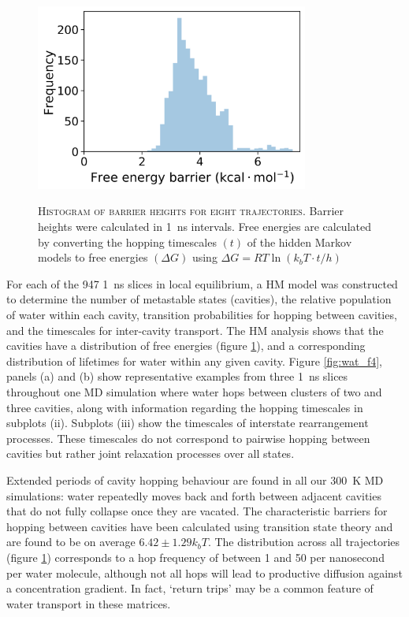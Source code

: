 \begin{figure}
    \centering
    \caption[Histogram of barrier heights for eight trajectories]{\textsc{Histogram of barrier heights for eight trajectories}. Barrier heights were calculated in \SI{1}{\nano\second} intervals. Free energies are calculated by converting the hopping timescales $(t)$ of the hidden Markov models to free energies $(\Delta G)$ using $\Delta G=R T \ln \left(k_{b} T \cdot t / h\right)$}
    \includegraphics[width=0.8\textwidth]{chapters/water_hopping/figures/Fig_S10.png}
    \label{fig:wat_s9}
\end{figure}

For each of the \num{947} \SI{1}{\nano\second} slices in local equilibrium, a HM model was constructed to determine the number of metastable states (cavities), the relative population of water within each cavity, transition probabilities for hopping between cavities, and the timescales for inter-cavity transport. The HM analysis shows that the cavities have a distribution of free energies (figure \ref{fig:wat_s9}), and a corresponding distribution of lifetimes for water within any given cavity. Figure \ref{fig:wat_f4}, panels (a) and (b) show representative examples from three \SI{1}{\nano\second} slices throughout one MD simulation where water hops between clusters of two and three cavities, along with information regarding the hopping timescales in subplots (ii). Subplots (iii) show the timescales of interstate rearrangement processes. These timescales do not correspond to pairwise hopping between cavities but rather joint relaxation processes over all states.

Extended periods of cavity hopping behaviour are found in all our \SI{300}{\kelvin} MD simulations: water repeatedly moves back and forth between adjacent cavities that do not fully collapse once they are vacated. The characteristic barriers for hopping between cavities have been calculated using transition state theory and are found to be on average $\num{6.42}\pm\num{1.29}k_{b}T$. The distribution across all trajectories (figure \ref{fig:wat_s9}) corresponds to a hop frequency of between \num{1} and \num{50} per nanosecond per water molecule, although not all hops will lead to productive diffusion against a concentration gradient. In fact, `return trips’ may be a common feature of water transport in these matrices.

